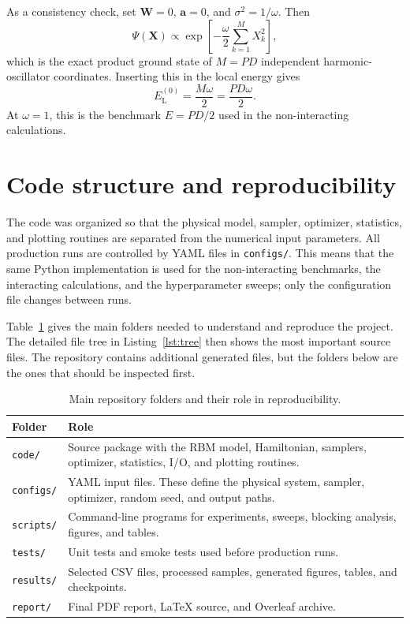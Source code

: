 \documentclass[10pt,a4paper]{article}
\newcommand{\bX}{\mathbf{X}}
\newcommand{\ba}{\mathbf{a}}
\newcommand{\bW}{\mathbf{W}}
\newcommand{\EL}{E_{\mathrm{L}}}
\newcommand{\code}[1]{\texttt{#1}}
\begin{document}
As a consistency check, set $\bW=0$, $\ba=0$, and $\sigma^2=1/\omega$. Then
\begin{equation}
\Psi(\bX)\propto \exp\left[-\frac{\omega}{2}\sum_{k=1}^{M}X_k^2\right],
\end{equation}
which is the exact product ground state of $M=PD$ independent harmonic-oscillator coordinates. Inserting this in the local energy gives
\begin{equation}
\EL^{(0)}=\frac{M\omega}{2}=\frac{PD\omega}{2}.
\end{equation}
At $\omega=1$, this is the benchmark $E=PD/2$ used in the non-interacting calculations.



\section{Code structure and reproducibility}\label{app:code}

The code was organized so that the physical model, sampler, optimizer, statistics, and plotting routines are separated from the numerical input parameters.  All production runs are controlled by YAML files in \code{configs/}.  This means that the same Python implementation is used for the non-interacting benchmarks, the interacting calculations, and the hyperparameter sweeps; only the configuration file changes between runs.

Table~\ref{tab:repo-folders} gives the main folders needed to understand and reproduce the project.  The detailed file tree in Listing~\ref{lst:tree} then shows the most important source files.  The repository contains additional generated files, but the folders below are the ones that should be inspected first.

\begin{table}[H]
\centering
\caption{Main repository folders and their role in reproducibility.}
\label{tab:repo-folders}
\begin{tabularx}{\columnwidth}{@{}>{\raggedright\arraybackslash}p{}X@{}}
\toprule
Folder & Role \\
\midrule
\code{code/} & Source package with the RBM model, Hamiltonian, samplers, optimizer, statistics, I/O, and plotting routines. \\
\code{configs/} & YAML input files. These define the physical system, sampler, optimizer, random seed, and output paths. \\
\code{scripts/} & Command-line programs for experiments, sweeps, blocking analysis, figures, and tables. \\
\code{tests/} & Unit tests and smoke tests used before production runs. \\
\code{results/} & Selected CSV files, processed samples, generated figures, tables, and checkpoints. \\
\code{report/} & Final PDF report, \LaTeX{} source, and Overleaf archive. \\
\bottomrule
\end{tabularx}
\end{table}
\end{document}
